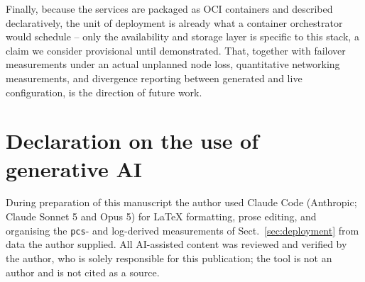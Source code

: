 \documentclass{webofc}
\begin{document}
Finally, because the services are packaged as OCI containers and
described declaratively, the unit of deployment is already what a
container orchestrator would schedule -- only the availability and
storage layer is specific to this stack, a claim we consider provisional
until demonstrated. That, together with failover measurements under an
actual unplanned node loss, quantitative networking measurements, and
divergence reporting between generated and live configuration, is the
direction of future work.

\section*{Declaration on the use of generative AI}

During preparation of this manuscript the author used Claude Code
(Anthropic; Claude Sonnet 5 and Opus 5) for LaTeX
formatting, prose editing, and organising the \texttt{pcs}- and
log-derived measurements of Sect.~\ref{sec:deployment} from data the
author supplied. All AI-assisted content was reviewed and verified by
the author, who is solely responsible for this publication; the tool is
not an author and is not cited as a source.
\end{document}
